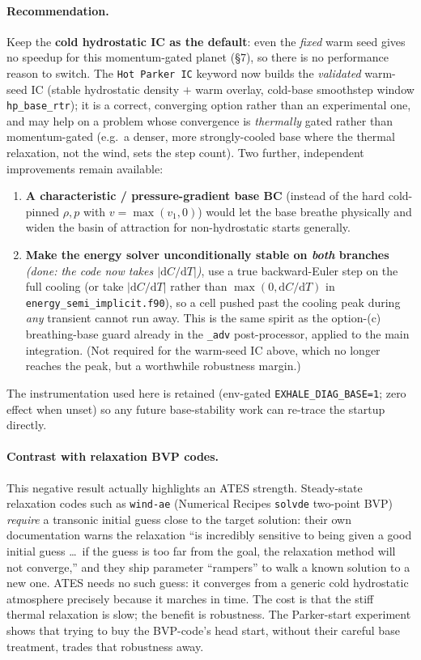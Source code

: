 \documentclass[english,a4paper]{my_memo}
\begin{document}
\paragraph{Recommendation.} Keep the \textbf{cold hydrostatic IC as the default}: even the
\emph{fixed} warm seed gives no speedup for this momentum-gated planet (\S7), so there is no
performance reason to switch. The \texttt{Hot Parker IC} keyword now builds the
\emph{validated} warm-seed IC (stable hydrostatic density $+$ warm overlay, cold-base smoothstep
window \texttt{hp\_base\_rtr}); it is a correct, converging option rather than an experimental
one, and may help on a problem whose convergence is \emph{thermally} gated rather than
momentum-gated (e.g.\ a denser, more strongly-cooled base where the thermal relaxation, not the
wind, sets the step count). Two further, independent improvements remain available:
\begin{enumerate}\itemsep2pt
\item \textbf{A characteristic / pressure-gradient base BC} (instead of the hard cold-pinned
  $\rho,p$ with $v=\max(v_1,0)$) would let the base breathe physically and widen the basin of
  attraction for non-hydrostatic starts generally.
\item \textbf{Make the energy solver unconditionally stable on \emph{both} branches}
  \emph{(done: the code now takes $|\mathrm dC/\mathrm dT|$)}, use a
  true backward-Euler step on the full cooling (or take $|\mathrm dC/\mathrm dT|$ rather than
  $\max(0,\mathrm dC/\mathrm dT)$ in \texttt{energy\_semi\_implicit.f90}), so a cell pushed past
  the cooling peak during \emph{any} transient cannot run away. This is the same spirit as the
  option-(c) breathing-base guard already in the \texttt{\_adv} post-processor, applied to the
  main integration. (Not required for the warm-seed IC above, which no longer reaches the peak,
  but a worthwhile robustness margin.)
\end{enumerate}

The instrumentation used here is retained (env-gated \texttt{EXHALE\_DIAG\_BASE=1};
zero effect when unset) so any future base-stability work can re-trace the startup directly.

\paragraph{Contrast with relaxation BVP codes.} This negative result actually highlights an
ATES strength. Steady-state relaxation codes such as \texttt{wind-ae} (Numerical Recipes
\texttt{solvde} two-point BVP) \emph{require} a transonic initial guess close to the target
solution: their own documentation warns the relaxation ``is incredibly sensitive to
being given a good initial guess \ldots\ if the guess is too far from the goal, the
relaxation method will not converge,'' and they ship parameter ``rampers'' to walk a known
solution to a new one. ATES needs no such guess: it converges from a generic cold
hydrostatic atmosphere precisely because it marches in time. The cost is that the stiff
thermal relaxation is slow; the benefit is robustness. The Parker-start experiment shows
that trying to buy the BVP-code's head start, without their careful base treatment, trades
that robustness away.
\end{document}
